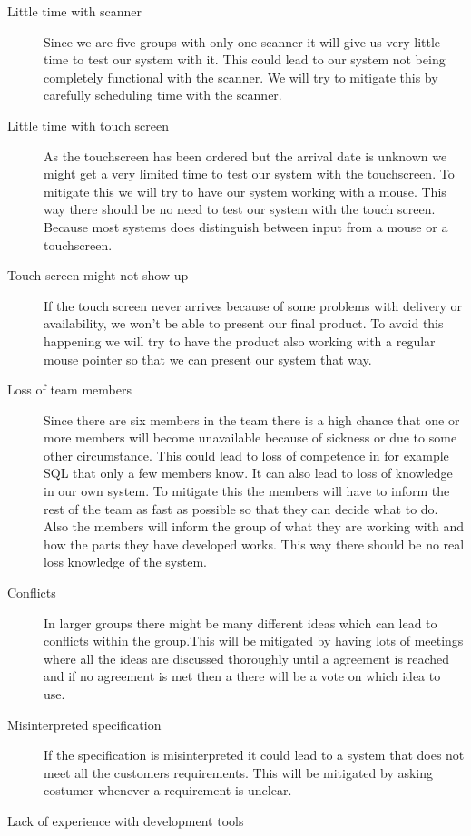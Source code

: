 \documentclass[a4paper,twoside,titlepage]{article}
\begin{document}
		\begin{description}
        	\item[Little time with scanner]
			Since we are five groups with only one scanner it will give us very little time to test our system with it. This could lead to our system not being completely functional with the scanner. We will try to mitigate this by carefully scheduling time with the scanner.
        	\item[Little time with touch screen]
			As the touchscreen has been ordered but the arrival date is unknown we might get a very limited time to test our system with the touchscreen.
			To mitigate this we will try to have our system working with a mouse. This way there should be no need to test our system with the touch screen. Because most systems does distinguish between input from a mouse or a touchscreen. 
        	\item[Touch screen might not show up]
			If the touch screen never arrives because of some problems with delivery or availability, we won't be able to present our final product. To avoid this happening we will try to have the product also working with a regular mouse pointer so that we can present our system that way.
        	\item[Loss of team members]
			Since there are six members in the team there is a high chance that one or more members will become unavailable because of sickness or due to some other circumstance. This could lead to loss of competence in for example SQL that only a few members know. It can also lead to loss of knowledge in our own system. To mitigate this the members will have to inform the rest of the team as fast as possible so that they can decide what to do. Also the members will inform the group of what they are working with and how the parts they have developed works. This way there should be no real loss knowledge of the system.
        	\item[Conflicts]
			In larger groups there might be many different ideas which can lead to conflicts within the group.This will be mitigated by having lots of meetings where all the ideas are discussed thoroughly until a agreement is reached and if no agreement is met then a there will be a vote on which idea to use.
		\item[Misinterpreted specification]
			If the specification is misinterpreted it could lead to a system that does not meet all the customers requirements. This will be mitigated by asking costumer whenever a requirement is unclear.
		\item[Lack of experience with development tools]

\end{description}
\end{document}
